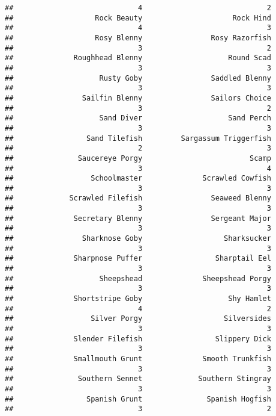 \documentclass[
]{article}
\begin{document}
\begin{verbatim}
##                             4                             2 
##                   Rock Beauty                     Rock Hind 
##                             4                             3 
##                   Rosy Blenny                Rosy Razorfish 
##                             3                             2 
##              Roughhead Blenny                    Round Scad 
##                             3                             3 
##                    Rusty Goby                Saddled Blenny 
##                             3                             3 
##                Sailfin Blenny                Sailors Choice 
##                             3                             2 
##                    Sand Diver                    Sand Perch 
##                             3                             3 
##                 Sand Tilefish         Sargassum Triggerfish 
##                             2                             3 
##               Saucereye Porgy                         Scamp 
##                             3                             4 
##                  Schoolmaster              Scrawled Cowfish 
##                             3                             3 
##             Scrawled Filefish                Seaweed Blenny 
##                             3                             3 
##              Secretary Blenny                Sergeant Major 
##                             3                             3 
##                Sharknose Goby                   Sharksucker 
##                             3                             3 
##              Sharpnose Puffer                 Sharptail Eel 
##                             3                             3 
##                    Sheepshead              Sheepshead Porgy 
##                             3                             3 
##              Shortstripe Goby                    Shy Hamlet 
##                             4                             2 
##                  Silver Porgy                   Silversides 
##                             3                             3 
##              Slender Filefish                 Slippery Dick 
##                             3                             3 
##              Smallmouth Grunt              Smooth Trunkfish 
##                             3                             3 
##               Southern Sennet             Southern Stingray 
##                             3                             3 
##                 Spanish Grunt               Spanish Hogfish 
##                             3                             2 

\end{verbatim}
\end{document}
